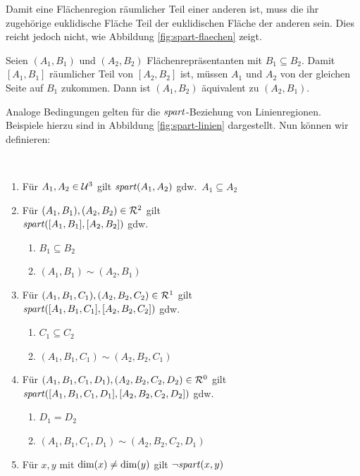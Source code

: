         Damit eine Flächenregion räumlicher Teil einer anderen ist, muss die ihr zugehörige euklidische Fläche Teil der euklidischen Fläche der anderen sein.
        Dies reicht jedoch nicht, wie Abbildung \ref{fig:spart-flaechen} zeigt.
        
        Seien $(A_1,B_1)$ und $(A_2,B_2)$ Flächenrepräsentanten mit $B_1 \subseteq B_2$. Damit $[A_1,B_1]$ räumlicher Teil von $[A_2,B_2]$ ist, müssen $A_1$ und $A_2$ von der gleichen Seite auf $B_1$ zukommen. Dann ist $(A_1,B_2)$ äquivalent zu $(A_2, B_1)$.
            
        Analoge Bedingungen gelten für die $\mathit{spart}$-Beziehung von Linienregionen. Beispiele hierzu sind in Abbildung \ref{fig:spart-linien} dargestellt.
        Nun können wir definieren:

        \begin{dfn}\ \vspace{0pt}

            \begin{enumerate}
                \item Für $A_1, A_2 \in \mathcal{U}^3$ gilt $\mathit{spart}(A_1,A_2)$ gdw.\ $A_1 \subseteq A_2$
                \item Für $(A_1,B_1), (A_2,B_2) \in \mathcal{R}^2$ gilt \\
                $\mathit{spart}([A_1,B_1],[A_2,B_2])$ gdw.\ 
                    \begin{enumerate}
                        \item $B_1 \subseteq B_2$
                        \item $(A_1, B_1) \sim (A_2, B_1)$
                    \end{enumerate}	
                \item Für $(A_1,B_1,C_1), (A_2,B_2,C_2) \in \mathcal{R}^1$ gilt \\
                $\mathit{spart}([A_1,B_1,C_1],[A_2,B_2,C_2])$ gdw.\ 
                    \begin{enumerate}
                        \item $C_1 \subseteq C_2$
                        \item $(A_1, B_1, C_1) \sim (A_2, B_2, C_1)$
                    \end{enumerate}	
                \item Für $(A_1,B_1,C_1,D_1), (A_2,B_2,C_2,D_2) \in \mathcal{R}^0$ gilt \\
                $\mathit{spart}([A_1,B_1,C_1,D_1],[A_2,B_2,C_2,D_2])$ gdw.\
                    \begin{enumerate}
                        \item $D_1 = D_2$
                        \item $(A_1, B_1, C_1, D_1) \sim (A_2, B_2, C_2, D_1)$
                    \end{enumerate}	
                \item Für $x, y$ mit $\text{dim}(x) \neq \text{dim}(y)$ gilt $\neg \mathit{spart}(x,y)$
            \end{enumerate}
            
        \end{dfn}
        
